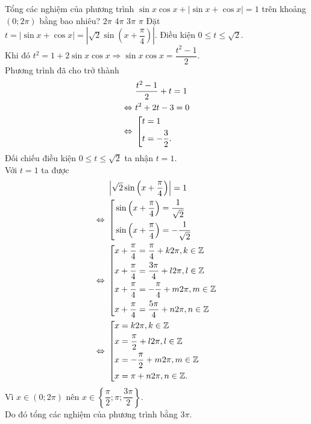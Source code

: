 \begin{ex}%
 Tổng các nghiệm của phương trình $\sin x \cos x + | \sin x + \cos x | = 1$ trên khoảng $(0; 2\pi)$ bằng bao nhiêu?
 \choice
  {$2 \pi$}
  {$4 \pi$}
  {\True $3 \pi$}
  {$\pi$}
 \loigiai
  {
  Đặt $t = | \sin x + \cos x| = \left| \sqrt{2} \sin \left( x + \dfrac{\pi}{4} \right) \right|$. Điều kiện $0 \leq t \leq \sqrt{2}$.\\
  Khi đó $t^2 = 1 + 2 \sin x \cos x \Rightarrow \sin x \cos x = \dfrac{t^2 - 1}{2}$.\\
  Phương trình đã cho trở thành
  \begin{align*}
   & \dfrac{t^2 - 1}{2} + t = 1 \\
   \Leftrightarrow \ & t^2 + 2t - 3 = 0 \\
   \Leftrightarrow \ & \left[\begin{aligned}& t = 1 \\& t = -\dfrac{3}{2}.\end{aligned}\right.
  \end{align*}
  Đối chiếu điều kiện $0 \leq t \leq \sqrt{2}$ ta nhận $t = 1$.\\
  Với $t = 1$ ta được
  \begin{align*}
   & \left| \sqrt{2} \sin \left( x + \dfrac{\pi}{4} \right) \right| = 1 \\
   \Leftrightarrow \ & \left[\begin{aligned}& \sin \left( x + \dfrac{\pi}{4} \right) = \dfrac{1}{\sqrt{2}} \\& \sin \left( x + \dfrac{\pi}{4} \right) = -\dfrac{1}{\sqrt{2}}\end{aligned}\right. \\
   \Leftrightarrow \ & \left[\begin{aligned}& x + \dfrac{\pi}{4} = \dfrac{\pi}{4} + k2\pi, k \in \mathbb{Z} \\& x + \dfrac{\pi}{4} = \dfrac{3\pi}{4} + l2\pi, l \in \mathbb{Z} \\& x + \dfrac{\pi}{4} = -\dfrac{\pi}{4} + m2\pi, m \in \mathbb{Z} \\& x + \dfrac{\pi}{4} = \dfrac{5\pi}{4} + n2\pi, n \in \mathbb{Z}\end{aligned}\right. \\
   \Leftrightarrow \ & \left[\begin{aligned}& x = k2\pi, k \in \mathbb{Z} \\& x = \dfrac{\pi}{2} + l2\pi, l \in \mathbb{Z} \\& x = - \dfrac{\pi}{2} + m2\pi, m \in \mathbb{Z} \\& x = \pi + n2\pi, n \in \mathbb{Z}.\end{aligned}\right.
  \end{align*}
  Vì $x \in (0;2\pi)$ nên $x \in \left\{ \dfrac{\pi}{2}; \pi; \dfrac{3\pi}{2} \right\}$.\\
  Do đó tổng các nghiệm của phương trình bằng $3 \pi$.
  }
\end{ex}


